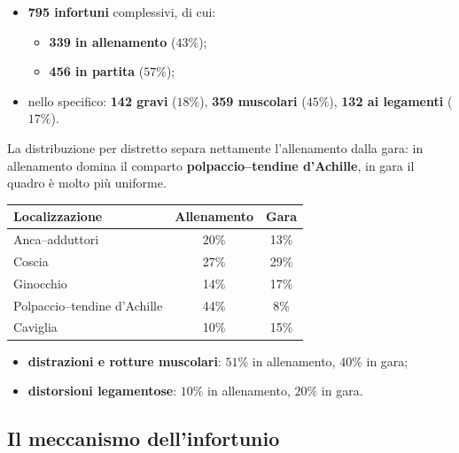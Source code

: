 \begin{itemize}
  \item \textbf{795 infortuni} complessivi, di cui:
    \begin{itemize}
      \item \textbf{339 in allenamento} ($43\%$);
      \item \textbf{456 in partita} ($57\%$);
    \end{itemize}
  \item nello specifico: \textbf{142 gravi} ($18\%$), \textbf{359 muscolari} ($45\%$),
    \textbf{132 ai legamenti} ($17\%$).
\end{itemize}

La distribuzione per distretto separa nettamente l'allenamento dalla gara: in allenamento domina il
comparto \textbf{polpaccio--tendine d'Achille}, in gara il quadro è molto più uniforme.

\begin{table}[htbp]
  \centering
  \small
  \renewcommand{\arraystretch}{1.3}
  \begin{tabularx}{\textwidth}{|X|c|c|}
    \hline
    \textbf{Localizzazione} & \textbf{Allenamento} & \textbf{Gara} \\
    \hline
    Anca--adduttori & 20\% & 13\% \\
    \hline
    Coscia & 27\% & 29\% \\
    \hline
    Ginocchio & 14\% & 17\% \\
    \hline
    Polpaccio--tendine d'Achille & 44\% & 8\% \\
    \hline
    Caviglia & 10\% & 15\% \\
    \hline
  \end{tabularx}
\end{table}

\begin{itemize}
  \item \textbf{distrazioni e rotture muscolari}: $51\%$ in allenamento, $40\%$ in gara;
  \item \textbf{distorsioni legamentose}: $10\%$ in allenamento, $20\%$ in gara.
\end{itemize}

\subsection{Il meccanismo dell'infortunio}

